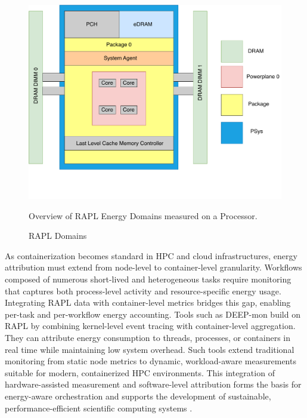 \begin{figure}[H]
    \centering
    \includegraphics[scale=0.5]{fig/02/02-rapl.pdf}
    \caption{RAPL Domains}
    \label{fig:02-rapl}
    \tiny
    Overview of RAPL Energy Domains measured on a Processor.
\end{figure}

As containerization becomes standard in HPC and cloud infrastructures, energy attribution must extend from node-level to container-level granularity. Workflows composed of numerous short-lived and heterogeneous tasks require monitoring that captures both process-level activity and resource-specific energy usage. Integrating RAPL data with container-level metrics bridges this gap, enabling per-task and per-workflow energy accounting.
Tools such as DEEP-mon build on RAPL by combining kernel-level event tracing with container-level aggregation. They can attribute energy consumption to threads, processes, or containers in real time while maintaining low system overhead. Such tools extend traditional monitoring from static node metrics to dynamic, workload-aware measurements suitable for modern, containerized HPC environments. This integration of hardware-assisted measurement and software-level attribution forms the basis for energy-aware orchestration and supports the development of sustainable, performance-efficient scientific computing systems \cite{8425477}.

